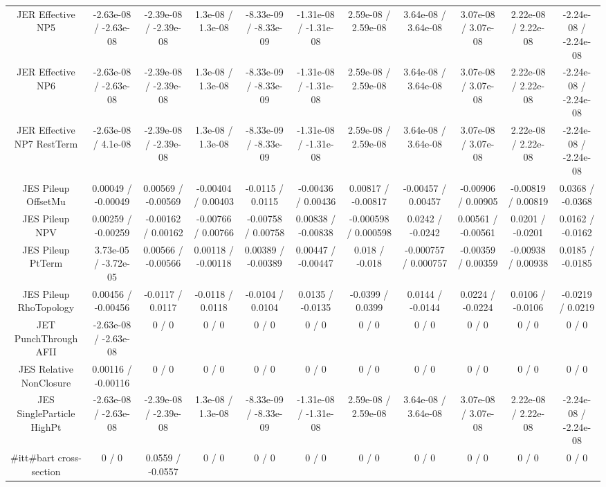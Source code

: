 \begin{table}[htbp]
\begin{center}
\begin{tabular}{|c|c|c|c|c|c|c|c|c|c|c|}
  JER Effective NP5 & -2.63e-08 / -2.63e-08 & -2.39e-08 / -2.39e-08 & 1.3e-08 / 1.3e-08 & -8.33e-09 / -8.33e-09 & -1.31e-08 / -1.31e-08 & 2.59e-08 / 2.59e-08 & 3.64e-08 / 3.64e-08 & 3.07e-08 / 3.07e-08 & 2.22e-08 / 2.22e-08 & -2.24e-08 / -2.24e-08 \\ 
  JER Effective NP6 & -2.63e-08 / -2.63e-08 & -2.39e-08 / -2.39e-08 & 1.3e-08 / 1.3e-08 & -8.33e-09 / -8.33e-09 & -1.31e-08 / -1.31e-08 & 2.59e-08 / 2.59e-08 & 3.64e-08 / 3.64e-08 & 3.07e-08 / 3.07e-08 & 2.22e-08 / 2.22e-08 & -2.24e-08 / -2.24e-08 \\ 
  JER Effective NP7 RestTerm & -2.63e-08 / 4.1e-08 & -2.39e-08 / -2.39e-08 & 1.3e-08 / 1.3e-08 & -8.33e-09 / -8.33e-09 & -1.31e-08 / -1.31e-08 & 2.59e-08 / 2.59e-08 & 3.64e-08 / 3.64e-08 & 3.07e-08 / 3.07e-08 & 2.22e-08 / 2.22e-08 & -2.24e-08 / -2.24e-08 \\ 
  JES Pileup OffsetMu & 0.00049 / -0.00049 & 0.00569 / -0.00569 & -0.00404 / 0.00403 & -0.0115 / 0.0115 & -0.00436 / 0.00436 & 0.00817 / -0.00817 & -0.00457 / 0.00457 & -0.00906 / 0.00905 & -0.00819 / 0.00819 & 0.0368 / -0.0368 \\ 
  JES Pileup NPV & 0.00259 / -0.00259 & -0.00162 / 0.00162 & -0.00766 / 0.00766 & -0.00758 / 0.00758 & 0.00838 / -0.00838 & -0.000598 / 0.000598 & 0.0242 / -0.0242 & 0.00561 / -0.00561 & 0.0201 / -0.0201 & 0.0162 / -0.0162 \\ 
  JES Pileup PtTerm & 3.73e-05 / -3.72e-05 & 0.00566 / -0.00566 & 0.00118 / -0.00118 & 0.00389 / -0.00389 & 0.00447 / -0.00447 & 0.018 / -0.018 & -0.000757 / 0.000757 & -0.00359 / 0.00359 & -0.00938 / 0.00938 & 0.0185 / -0.0185 \\ 
  JES Pileup RhoTopology & 0.00456 / -0.00456 & -0.0117 / 0.0117 & -0.0118 / 0.0118 & -0.0104 / 0.0104 & 0.0135 / -0.0135 & -0.0399 / 0.0399 & 0.0144 / -0.0144 & 0.0224 / -0.0224 & 0.0106 / -0.0106 & -0.0219 / 0.0219 \\ 
  JET PunchThrough AFII & -2.63e-08 / -2.63e-08 & 0 / 0 & 0 / 0 & 0 / 0 & 0 / 0 & 0 / 0 & 0 / 0 & 0 / 0 & 0 / 0 & 0 / 0 \\ 
  JES Relative NonClosure & 0.00116 / -0.00116 & 0 / 0 & 0 / 0 & 0 / 0 & 0 / 0 & 0 / 0 & 0 / 0 & 0 / 0 & 0 / 0 & 0 / 0 \\ 
  JES SingleParticle HighPt & -2.63e-08 / -2.63e-08 & -2.39e-08 / -2.39e-08 & 1.3e-08 / 1.3e-08 & -8.33e-09 / -8.33e-09 & -1.31e-08 / -1.31e-08 & 2.59e-08 / 2.59e-08 & 3.64e-08 / 3.64e-08 & 3.07e-08 / 3.07e-08 & 2.22e-08 / 2.22e-08 & -2.24e-08 / -2.24e-08 \\ 
  #it{t#bar{t}} cross-section & 0 / 0 & 0.0559 / -0.0557 & 0 / 0 & 0 / 0 & 0 / 0 & 0 / 0 & 0 / 0 & 0 / 0 & 0 / 0 & 0 / 0 \\ 

\end{tabular}
\end{center}
\end{table}
